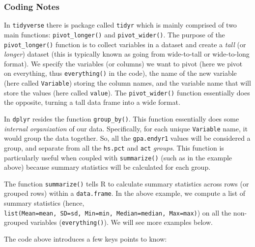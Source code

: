 \documentclass[
]{book}
\begin{document}
\hypertarget{coding-notes}{%
\subsubsection{Coding Notes}\label{coding-notes}}

In \texttt{tidyverse} there is package called \texttt{tidyr} \citep{R-tidyr} which is mainly comprised of two main functions: \texttt{pivot\_longer()} and \texttt{pivot\_wider()}.
The purpose of the \texttt{pivot\_longer()} function is to collect variables in a dataset and create a \emph{tall} (or \emph{longer}) dataset (this is typically known as going from wide-to-tall or wide-to-long format).
We specify the variables (or columns) we want to pivot (here we pivot on everything, thus \texttt{everything()} in the code), the name of the new variable (here called \texttt{Variable}) storing the column names, and the variable name that will store the values (here called \texttt{value}).
The \texttt{pivot\_wider()} function essentially does the opposite, turning a tall data frame into a wide format.

In \texttt{dplyr} resides the function \texttt{group\_by()}.
This function essentially does some \emph{internal organization} of our data.
Specifically, for each unique \texttt{Variable} name, it would group the data together.
So, all the \texttt{gpa.endyr1} values will be considered a group, and separate from all the \texttt{hs.pct} and \texttt{act} \emph{groups}.
This function is particularly useful when coupled with \texttt{summarize()} (such as in the example above) because summary statistics will be calculated for each group.

The function \texttt{summarize()} tells R to calculate summary statistics across rows (or grouped rows) within a \texttt{data.frame}. In the above example, we compute a list of summary statistics (hence, \texttt{list(Mean=mean,\ SD=sd,\ Min=min,\ Median=median,\ Max=max)}) on all the non-grouped variables (\texttt{everything()}). We will see more examples below.

The code above introduces a few keys points to know:
\end{document}
